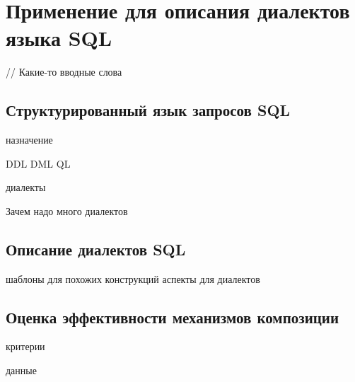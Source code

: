 \part{Применение  для описания диалектов языка SQL}\label{part3}

// Какие-то вводные слова

\chapter{Структурированный язык запросов SQL}

назначение

DDL DML QL

диалекты

Зачем надо много диалектов

\chapter{Описание диалектов SQL}

шаблоны для похожих конструкций
аспекты для диалектов

\chapter{Оценка эффективности механизмов композиции }

критерии

данные